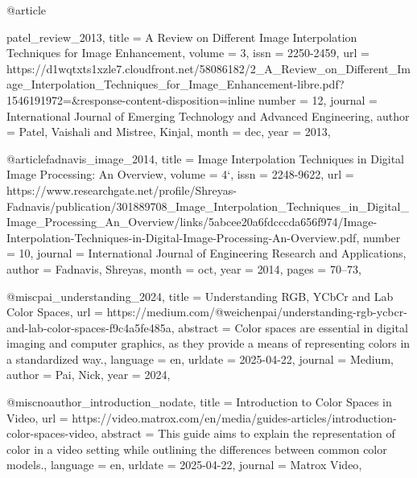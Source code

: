 @article{patel_review_2013,
	title = {A {Review} on {Different} {Image} {Interpolation} {Techniques} for {Image} {Enhancement}},
	volume = {3},
	issn = {2250-2459},
	url = {https://d1wqtxts1xzle7.cloudfront.net/58086182/2_A_Review_on_Different_Image_Interpolation_Techniques_for_Image_Enhancement-libre.pdf?1546191972=&response-content-disposition=inline%
	number = {12},
	journal = {International Journal of Emerging Technology and Advanced Engineering},
	author = {Patel, Vaishali and Mistree, Kinjal},
	month = dec,
	year = {2013},
}

@article{fadnavis_image_2014,
	title = {Image {Interpolation} {Techniques} in {Digital} {Image} {Processing}: {An} {Overview}},
	volume = {4`},
	issn = {2248-9622},
	url = {https://www.researchgate.net/profile/Shreyas-Fadnavis/publication/301889708_Image_Interpolation_Techniques_in_Digital_Image_Processing_An_Overview/links/5abcee20a6fdcccda656f974/Image-Interpolation-Techniques-in-Digital-Image-Processing-An-Overview.pdf},
	number = {10},
	journal = {International Journal of Engineering Research and Applications},
	author = {Fadnavis, Shreyas},
	month = oct,
	year = {2014},
	pages = {70--73},
}

@misc{pai_understanding_2024,
	title = {Understanding {RGB}, {YCbCr} and {Lab} {Color} {Spaces}},
	url = {https://medium.com/@weichenpai/understanding-rgb-ycbcr-and-lab-color-spaces-f9c4a5fe485a},
	abstract = {Color spaces are essential in digital imaging and computer graphics, as they provide a means of representing colors in a standardized way.},
	language = {en},
	urldate = {2025-04-22},
	journal = {Medium},
	author = {Pai, Nick},
	year = {2024},
}

@misc{noauthor_introduction_nodate,
	title = {Introduction to {Color} {Spaces} in {Video}},
	url = {https://video.matrox.com/en/media/guides-articles/introduction-color-spaces-video},
	abstract = {This guide aims to explain the representation of color in a video setting while outlining the differences between common color models.},
	language = {en},
	urldate = {2025-04-22},
	journal = {Matrox Video},
}

}
